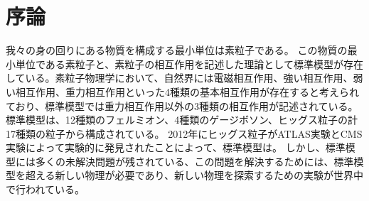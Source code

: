 \chapter{序論}
我々の身の回りにある物質を構成する最小単位は素粒子である。
この物質の最小単位である素粒子と、素粒子の相互作用を記述した理論として標準模型が存在している。素粒子物理学において、自然界には電磁相互作用、強い相互作用、弱い相互作用、重力相互作用といった4種類の基本相互作用が存在すると考えられており、標準模型では重力相互作用以外の3種類の相互作用が記述されている。
標準模型は、12種類のフェルミオン、4種類のゲージボソン、ヒッグス粒子の計17種類の粒子から構成されている。
2012年にヒッグス粒子がATLAS実験とCMS実験によって実験的に発見されたことによって、標準模型は。
しかし、標準模型には多くの未解決問題が残されている、この問題を解決するためには、標準模型を超える新しい物理が必要であり、新しい物理を探索するための実験が世界中で行われている。



